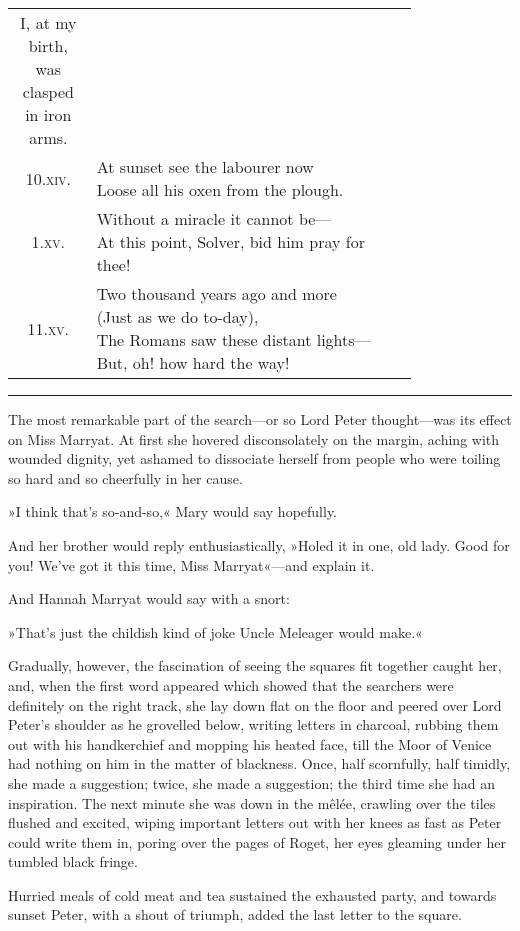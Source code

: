 \begin{longtable} {c p{0.8\linewidth}}
{I, at my birth, was clasped in iron arms.}\\
10.\textsc{xiv.} &  \makecell[l]{At sunset see the labourer now\\
Loose all his oxen from the plough.}\\
1.\textsc{xv.} &  \makecell[l]{Without a miracle it cannot be—\\
At this point, Solver, bid him pray for thee!}\\[.3cm] 
11.\textsc{xv.} &  \makecell[l]{Two thousand years ago and more\\
(Just as we do to-day),\\
The Romans saw these distant lights—\\
But, oh! how hard the way!}
\end{longtable}

\noindent\hfil\rule{0.5\textwidth}{.4pt}\hfil 

The most remarkable part of the search—or so Lord Peter thought—was its effect on Miss Marryat. At first she hovered disconsolately on the margin, aching with wounded dignity, yet ashamed to dissociate herself from people who were toiling so hard and so cheerfully in her cause.

»I think that's so-and-so,« Mary would say hopefully.

And her brother would reply enthusiastically, »Holed it in one, old lady. Good for you! We've got it this time, Miss Marryat«—and explain it.

And Hannah Marryat would say with a snort:

»That's just the childish kind of joke Uncle Meleager would make.«

Gradually, however, the fascination of seeing the squares fit together caught her, and, when the first word appeared which showed that the searchers were definitely on the right track, she lay down flat on the floor and peered over Lord Peter's shoulder as he grovelled below, writing letters in charcoal, rubbing them out with his handkerchief and mopping his heated face, till the Moor of Venice had nothing on him in the matter of blackness. Once, half scornfully, half timidly, she made a suggestion; twice, she made a suggestion; the third time she had an inspiration. The next minute she was down in the mêlée, crawling over the tiles flushed and excited, wiping important letters out with her knees as fast as Peter could write them in, poring over the pages of Roget, her eyes gleaming under her tumbled black fringe.

Hurried meals of cold meat and tea sustained the exhausted party, and towards sunset Peter, with a shout of triumph, added the last letter to the square.

